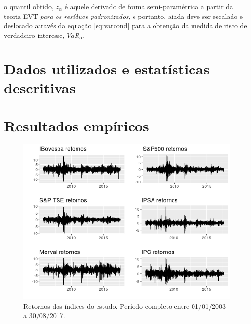 \documentclass[review]{elsarticle}
\theoremstyle{definition}
\begin{document}
o quantil obtido, $z_\alpha$ é aquele derivado de forma semi-paramétrica a partir da teoria EVT \emph{para os resíduos padronizados}, e portanto, ainda deve ser escalado e deslocado através da equação \eqref{eq:varcond} para a obtenção da medida de risco de verdadeiro interesse, $VaR_\alpha$.

\section{Dados utilizados e estatísticas descritivas}

\section{Resultados empíricos}







	





\begin{figure}[H]
	\centering
	\includegraphics[width=0.9\linewidth]{figs/artigo-retornos}
	\caption{Retornos dos índices do estudo. Período completo entre 01/01/2003 a 30/08/2017.}
	\label{fig:artigo-retornos}
\end{figure}
\end{document}
